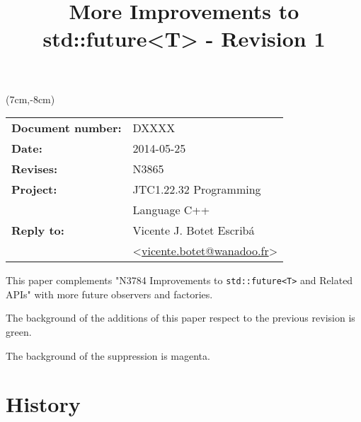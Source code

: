 \documentclass[a4paper,10pt]{article}
\title{More Improvements to std::future<T> - Revision 1}
\author{}
\date{}
\newcommand{\cpp}[1]{\lstinline{#1}}
\begin{document}
\maketitle
\begin{textblock*}{9cm}(7cm,-8cm)
\begin{tabular}{l l}
\textbf{Document number:} & DXXXX \\
\textbf{Date:}  & 2014-05-25 \\
\textbf{Revises:} & N3865 \\
\textbf{Project:} & JTC1.22.32 Programming \\
 & Language C++ \\
\textbf{Reply to:} & Vicente J. Botet Escrib\'{a} \\
 & <\href{mailto:vicente.botet@wanadoo.fr}{vicente.botet@wanadoo.fr}> 
  
\end{tabular}
\end{textblock*}

\vspace{-6em}
\setcounter{tocdepth}{1}

This paper complements "N3784 Improvements to \cpp{std::future<T>} and Related APIs" \cite{N3784} with more future observers and factories.

The background of the additions of this paper respect to the previous revision is green.

The background of the suppression is magenta.

\tableofcontents

\section{History}
\end{document}

